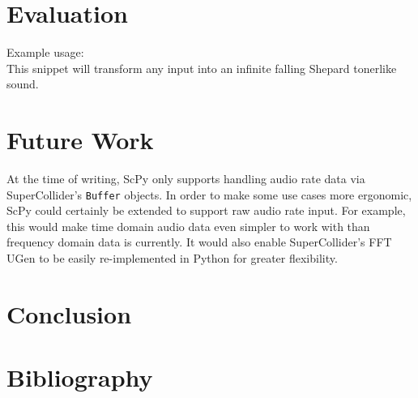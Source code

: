 \documentclass{article}
\begin{document}
\section{Evaluation}

Example usage:\\
This snippet will transform any input into an infinite falling Shepard tonerlike
sound.


\section{Future Work}

At the time of writing, ScPy only supports handling audio rate data via SuperCollider's
\texttt{Buffer} objects. In order to make some use cases more ergonomic, ScPy could certainly be
extended to support raw audio rate input. For example, this would make time domain audio data even
simpler to work with than frequency domain data is currently. It would also enable
SuperCollider's FFT UGen to be easily re-implemented in Python for greater flexibility.

\section{Conclusion}

\section{Bibliography}
\end{document}
